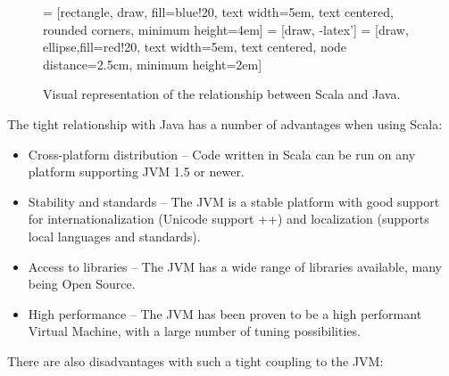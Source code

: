 \documentclass[a4paper,english]{report}
\begin{document}
\begin{figure}
  \begin{center}
   = [rectangle, draw, fill=blue!20, text width=5em, text centered, rounded corners, minimum height=4em]
   = [draw, -latex']
   = [draw, ellipse,fill=red!20, text width=5em, text centered, node distance=2.5cm, minimum height=2em]
  \end{center}
  \caption{Visual representation of the relationship between Scala and
    Java.\label{fig:scalajava}}
\end{figure}

The tight relationship with Java has a number of advantages when using
Scala:

\begin{itemize}
\item Cross-platform distribution -- Code written in Scala can be run
  on any platform supporting JVM 1.5 or newer.
\item Stability and standards -- The JVM is a stable platform with
  good support for internationalization (Unicode support ++) and
  localization (supports local languages and standards).
\item Access to libraries -- The JVM has a wide range of libraries
  available, many being Open Source.
\item High performance -- The JVM has been proven to be a high
  performant Virtual Machine, with a large number of tuning
  possibilities.
\end{itemize}

There are also disadvantages with such a tight coupling to the JVM:
\end{document}
